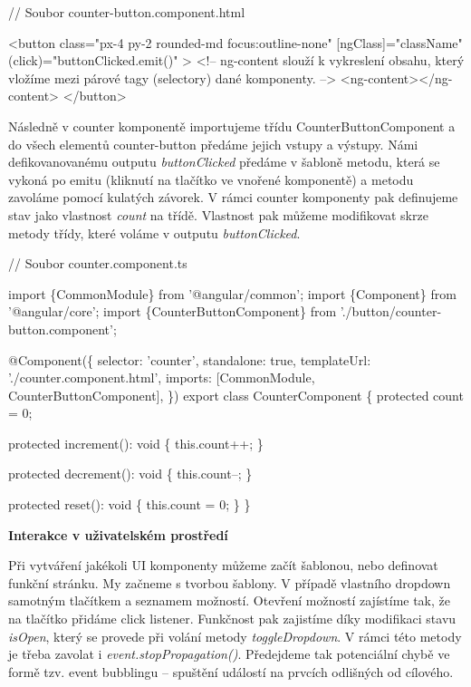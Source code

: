 \begin{prog}
// Soubor counter-button.component.html

<button
  class="px-4 py-2 rounded-md focus:outline-none"
  [ngClass]="className"
  (click)="buttonClicked.emit()"
>
  <!-- ng-content slouží k vykreslení obsahu, který vložíme
   mezi párové tagy (selectory) dané komponenty. -->
  <ng-content></ng-content>
</button>
\end{prog}

Následně v counter komponentě importujeme třídu CounterButtonComponent a do všech elementů counter-button předáme jejich vstupy a výstupy. 
Námi defikovanovanému outputu \emph{buttonClicked} předáme v šabloně metodu, která se vykoná po emitu (kliknutí na tlačítko ve vnořené komponentě) a metodu zavoláme pomocí kulatých závorek. 
V rámci counter komponenty pak definujeme stav jako vlastnost \emph{count} na třídě. Vlastnost pak můžeme modifikovat skrze metody třídy, které voláme v outputu \emph{buttonClicked}.

\begin{prog}
// Soubor counter.component.ts

import \{CommonModule\} from '@angular/common';
import \{Component\} from '@angular/core';
import \{CounterButtonComponent\} from './button/counter-button.component';

@Component(\{
  selector: 'counter',
  standalone: true,
  templateUrl: './counter.component.html',
  imports: [CommonModule, CounterButtonComponent],
\})
export class CounterComponent \{
  protected count = 0;

  protected increment(): void \{
    this.count++;
  \}

  protected decrement(): void \{
    this.count--;
  \}

  protected reset(): void \{
    this.count = 0;
  \}
\}
\end{prog}

\begin{flushleft}
  \textbf{Interakce v uživatelském prostředí}
\end{flushleft}

Při vytváření jakékoli UI komponenty můžeme začít šablonou, nebo definovat funkční stránku. My začneme s tvorbou šablony. V případě vlastního dropdown samotným tlačítkem a seznamem možností. 
Otevření možností zajístíme tak, že na tlačítko přidáme click listener. Funkčnost pak zajistíme díky modifikaci stavu \emph{isOpen}, který se provede při volání metody \emph{toggleDropdown}. 
V rámci této metody je třeba zavolat i \emph{event.stopPropagation()}. Předejdeme tak potenciální chybě ve formě tzv. event bubblingu -- spuštění událostí na prvcích odlišných od cílového.

